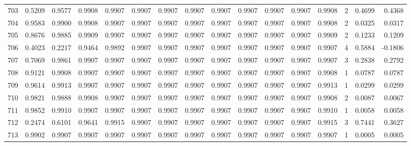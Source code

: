 \begin{tabular}{lrrrrrrrrrrrrrrr}
703 &      0.5209 &  0.9577 &  0.9908 &  0.9907 &  0.9907 &  0.9907 &  0.9907 &  0.9907 &  0.9907 &  0.9907 &   0.9907 &     0.9908 &      2 &                    0.4699 &                     0.4368 \\
704 &      0.9583 &  0.9900 &  0.9908 &  0.9907 &  0.9907 &  0.9907 &  0.9907 &  0.9907 &  0.9907 &  0.9907 &   0.9907 &     0.9908 &      2 &                    0.0325 &                     0.0317 \\
705 &      0.8676 &  0.9885 &  0.9909 &  0.9907 &  0.9907 &  0.9907 &  0.9907 &  0.9907 &  0.9907 &  0.9907 &   0.9907 &     0.9909 &      2 &                    0.1233 &                     0.1209 \\
706 &      0.4023 &  0.2217 &  0.9464 &  0.9892 &  0.9907 &  0.9907 &  0.9907 &  0.9907 &  0.9907 &  0.9907 &   0.9907 &     0.9907 &      4 &                    0.5884 &                    -0.1806 \\
707 &      0.7069 &  0.9861 &  0.9907 &  0.9907 &  0.9907 &  0.9907 &  0.9907 &  0.9907 &  0.9907 &  0.9907 &   0.9907 &     0.9907 &      3 &                    0.2838 &                     0.2792 \\
708 &      0.9121 &  0.9908 &  0.9907 &  0.9907 &  0.9907 &  0.9907 &  0.9907 &  0.9907 &  0.9907 &  0.9907 &   0.9907 &     0.9908 &      1 &                    0.0787 &                     0.0787 \\
709 &      0.9614 &  0.9913 &  0.9907 &  0.9907 &  0.9907 &  0.9907 &  0.9907 &  0.9907 &  0.9907 &  0.9907 &   0.9907 &     0.9913 &      1 &                    0.0299 &                     0.0299 \\
710 &      0.9821 &  0.9888 &  0.9908 &  0.9907 &  0.9907 &  0.9907 &  0.9907 &  0.9907 &  0.9907 &  0.9907 &   0.9907 &     0.9908 &      2 &                    0.0087 &                     0.0067 \\
711 &      0.9852 &  0.9910 &  0.9907 &  0.9907 &  0.9907 &  0.9907 &  0.9907 &  0.9907 &  0.9907 &  0.9907 &   0.9907 &     0.9910 &      1 &                    0.0058 &                     0.0058 \\
712 &      0.2474 &  0.6101 &  0.9641 &  0.9915 &  0.9907 &  0.9907 &  0.9907 &  0.9907 &  0.9907 &  0.9907 &   0.9907 &     0.9915 &      3 &                    0.7441 &                     0.3627 \\
713 &      0.9902 &  0.9907 &  0.9907 &  0.9907 &  0.9907 &  0.9907 &  0.9907 &  0.9907 &  0.9907 &  0.9907 &   0.9907 &     0.9907 &      1 &                    0.0005 &                     0.0005 \\

\end{tabular}
